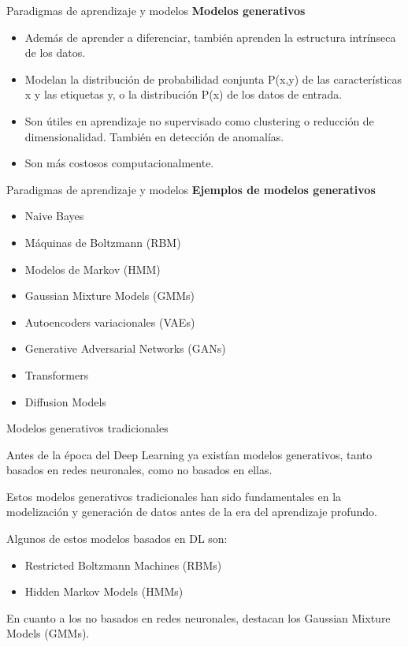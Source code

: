 \begin{frame}{Paradigmas de aprendizaje y modelos}
\textbf{Modelos generativos}

\begin{itemize}
    \item Además de aprender a diferenciar, también aprenden la estructura intrínseca de los datos.
    \item Modelan la distribución de probabilidad conjunta P(x,y) de las características x y las etiquetas y, o la distribución P(x) de los datos de entrada.
    \item Son útiles en aprendizaje no supervisado como clustering o reducción de dimensionalidad. También en detección de anomalías. 
    \item Son más costosos computacionalmente.
\end{itemize}

\end{frame}

\begin{frame}{Paradigmas de aprendizaje y modelos}
\textbf{Ejemplos de modelos generativos}

\begin{itemize}
    \item Naive Bayes
    \item Máquinas de Boltzmann (RBM)
    \item Modelos de Markov (HMM)
    \item Gaussian Mixture Models (GMMs)
    \item Autoencoders variacionales (VAEs)
    \item Generative Adversarial Networks (GANs)
    \item Transformers
    \item Diffusion Models
\end{itemize}

\end{frame}


\begin{frame}{Modelos generativos tradicionales}

Antes de la época del Deep Learning ya existían modelos generativos, tanto basados en redes neuronales, como no basados en ellas.

Estos modelos generativos tradicionales han sido fundamentales en la modelización y generación de datos antes de la era del aprendizaje profundo.

Algunos de estos modelos basados en DL son:

\begin{itemize}
    \item Restricted Boltzmann Machines (RBMs)
    \item Hidden Markov Models (HMMs)
\end{itemize}

En cuanto a los no basados en redes neuronales, destacan los Gaussian Mixture Models (GMMs).

\end{frame}


